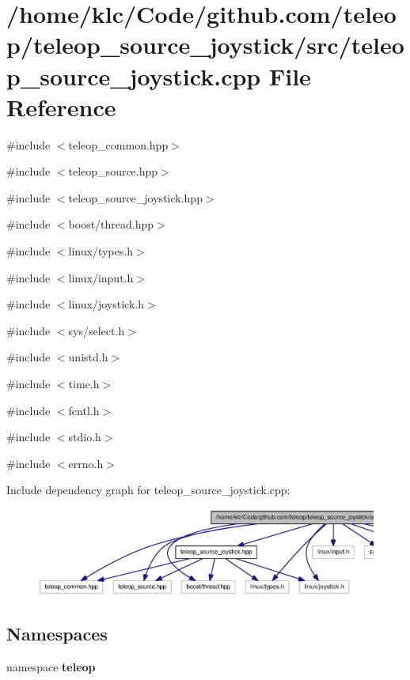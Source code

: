 \section{/home/klc/Code/github.com/teleop/teleop\_\-source\_\-joystick/src/teleop\_\-source\_\-joystick.cpp File Reference}
\label{teleop__source__joystick_8cpp}
{\ttfamily \#include $<$teleop\_\-common.hpp$>$}\par
{\ttfamily \#include $<$teleop\_\-source.hpp$>$}\par
{\ttfamily \#include $<$teleop\_\-source\_\-joystick.hpp$>$}\par
{\ttfamily \#include $<$boost/thread.hpp$>$}\par
{\ttfamily \#include $<$linux/types.h$>$}\par
{\ttfamily \#include $<$linux/input.h$>$}\par
{\ttfamily \#include $<$linux/joystick.h$>$}\par
{\ttfamily \#include $<$sys/select.h$>$}\par
{\ttfamily \#include $<$unistd.h$>$}\par
{\ttfamily \#include $<$time.h$>$}\par
{\ttfamily \#include $<$fcntl.h$>$}\par
{\ttfamily \#include $<$stdio.h$>$}\par
{\ttfamily \#include $<$errno.h$>$}\par
Include dependency graph for teleop\_\-source\_\-joystick.cpp:
\nopagebreak
\begin{figure}[H]
\begin{center}
\leavevmode
\includegraphics[width=400pt]{teleop__source__joystick_8cpp__incl}
\end{center}
\end{figure}
\subsection*{Namespaces}
\begin{DoxyCompactItemize}
\item 
namespace {\bf teleop}
\end{DoxyCompactItemize}
